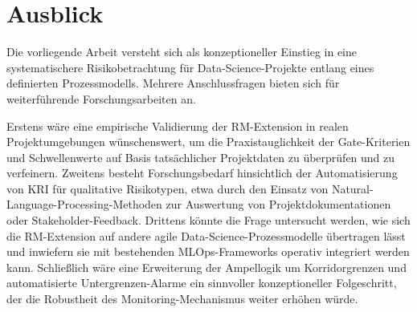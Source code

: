 \section{Ausblick}

Die vorliegende Arbeit versteht sich als konzeptioneller Einstieg in eine 
systematischere Risikobetrachtung für Data-Science-Projekte entlang eines 
definierten Prozessmodells. Mehrere Anschlussfragen bieten sich für 
weiterführende Forschungsarbeiten an.

Erstens wäre eine empirische Validierung der RM-Extension in realen 
Projektumgebungen wünschenswert, um die Praxistauglichkeit der Gate-Kriterien 
und Schwellenwerte auf Basis tatsächlicher Projektdaten zu überprüfen und 
zu verfeinern. Zweitens besteht Forschungsbedarf hinsichtlich der Automatisierung 
von KRI für qualitative Risikotypen, etwa durch den Einsatz von 
Natural-Language-Processing-Methoden zur Auswertung von Projektdokumentationen 
oder Stakeholder-Feedback. Drittens könnte die Frage untersucht werden, wie sich 
die RM-Extension auf andere agile Data-Science-Prozessmodelle übertragen lässt 
und inwiefern sie mit bestehenden MLOps-Frameworks operativ integriert werden kann. 
Schließlich wäre eine Erweiterung der Ampellogik um Korridorgrenzen und 
automatisierte Untergrenzen-Alarme ein sinnvoller konzeptioneller Folgeschritt, 
der die Robustheit des Monitoring-Mechanismus weiter erhöhen würde.
